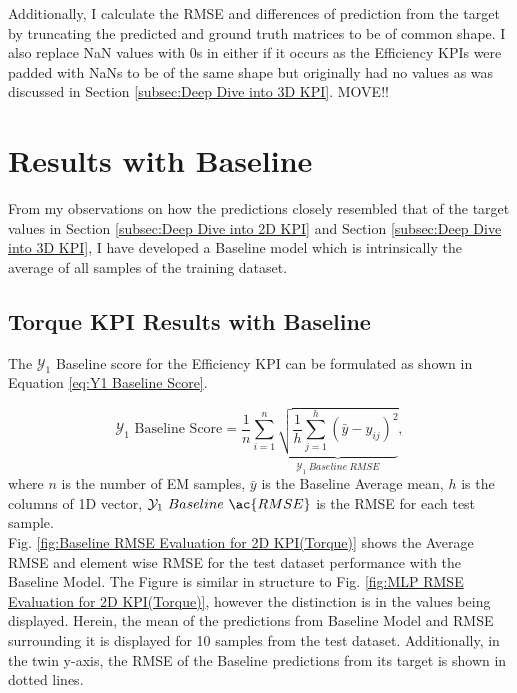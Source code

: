 \documentclass{report} %
\begin{document}
Additionally, I calculate the \ac{RMSE} and differences of prediction from the target by truncating the predicted and ground truth matrices to be of common shape.
I also replace \ac{NaN} values with 0s in either if it occurs as the Efficiency \ac{KPI}s were padded with \ac{NaN}s to be of the same shape but originally 
had no values as was discussed in Section \ref{subsec:Deep Dive into 3D KPI}. MOVE!!

\section{Results with Baseline}\label{sec:Results with Baseline}

From my observations on how the predictions closely resembled that of the target values in Section \ref{subsec:Deep Dive into 2D KPI} and 
Section \ref{subsec:Deep Dive into 3D KPI}, I have developed a Baseline model which is intrinsically the average of all samples of the training dataset.

\subsection{Torque KPI Results with Baseline}\label{subsec:Torque KPI Results with Baseline}

The $\mathcal{Y}_1$ Baseline score for the Efficiency \ac{KPI} can be formulated as shown in Equation \ref{eq:Y1 Baseline Score}.

\begin{equation}
    \text{$\mathcal{Y}_1$ Baseline Score} = \frac{1}{n} \sum_{i=1}^{n} \underbrace{ \sqrt{\frac{1}{h} \sum_{j=1}^{h} (\bar{y} - y_{ij})^2}}_{\mathcal{Y}_1\ Baseline\ RMSE},
    \label{eq:Y1 Baseline Score}
\end{equation}
where \(n\) is the number of \ac{EM} samples, \(\bar{y}\) is the Baseline Average mean, \(h\) is the columns of 1D vector, \(\mathcal{Y}_1\ Baseline\ \ac{RMSE}\) is the \ac{RMSE} for each test sample.\\

Fig. \ref{fig:Baseline RMSE Evaluation for 2D KPI(Torque)} shows the Average \ac{RMSE} and element wise \ac{RMSE} for the test dataset performance with the 
Baseline Model. The Figure is similar in structure to Fig. \ref{fig:MLP RMSE Evaluation for 2D KPI(Torque)}, however the distinction is in the values being displayed. 
Herein, the mean of the predictions from Baseline Model and \ac{RMSE} surrounding it is displayed for 10 samples from the test dataset. Additionally, in the twin y-axis, 
the \ac{RMSE} of the Baseline predictions from its target is shown in dotted lines.
\end{document}
